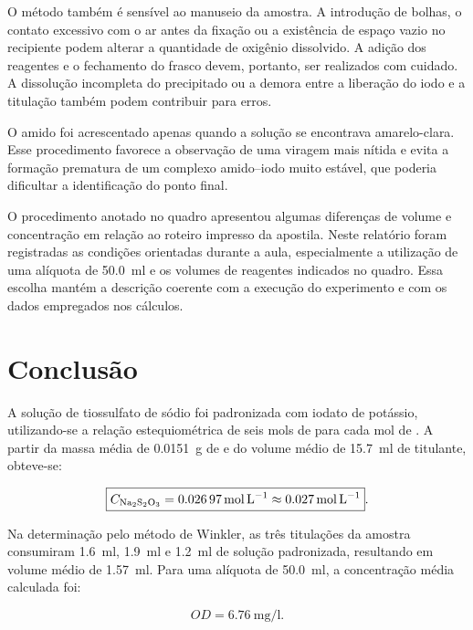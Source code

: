\documentclass[a4paper,12pt]{article}
\begin{document}
O método também é sensível ao manuseio da amostra. A introdução de bolhas, o
contato excessivo com o ar antes da fixação ou a existência de espaço vazio
no recipiente podem alterar a quantidade de oxigênio dissolvido. A adição dos
reagentes e o fechamento do frasco devem, portanto, ser realizados com
cuidado. A dissolução incompleta do precipitado ou a demora entre a liberação
do iodo e a titulação também podem contribuir para erros.

O amido foi acrescentado apenas quando a solução se encontrava amarelo-clara.
Esse procedimento favorece a observação de uma viragem mais nítida e evita a
formação prematura de um complexo amido--iodo muito estável, que poderia
dificultar a identificação do ponto final.

O procedimento anotado no quadro apresentou algumas diferenças de volume e
concentração em relação ao roteiro impresso da apostila. Neste relatório foram
registradas as condições orientadas durante a aula, especialmente a utilização
de uma alíquota de \qty{50.0}{\milli\litre} e os volumes de reagentes indicados
no quadro. Essa escolha mantém a descrição coerente com a execução do
experimento e com os dados empregados nos cálculos.

\section{Conclusão}

A solução de tiossulfato de sódio foi padronizada com iodato de potássio,
utilizando-se a relação estequiométrica de seis mols de  para
cada mol de . A partir da massa média de
\qty{0.0151}{\gram} de  e do volume médio de
\qty{15.7}{\milli\litre} de titulante, obteve-se:

\begin{equation*}
\boxed{
C_{\ce{Na2S2O3}}=\qty{0.02697}{\mole\per\litre}
\approx\qty{0.027}{\mole\per\litre}
}.
\end{equation*}

Na determinação pelo método de Winkler, as três titulações da amostra
consumiram \qty{1.6}{\milli\litre}, \qty{1.9}{\milli\litre} e
\qty{1.2}{\milli\litre} de solução padronizada, resultando em volume médio
de \qty{1.57}{\milli\litre}. Para uma alíquota de
\qty{50.0}{\milli\litre}, a concentração média calculada foi:

\begin{equation*}
\boxed{OD=\qty{6.76}{\milli\gram\per\litre}}.
\end{equation*}
\end{document}
